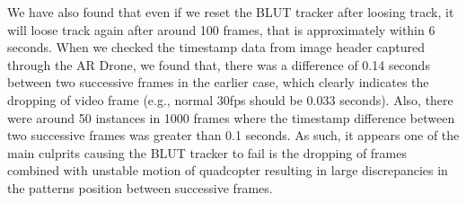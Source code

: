 \documentclass[10pt,twocolumn,letterpaper]{article}
\begin{document}
We have also found that even if we reset the BLUT tracker after loosing track,
it will loose track again after around 100 frames, that is approximately within
6 seconds. When we checked the timestamp data from image header captured through
the AR Drone, we found that, there was a difference of 0.14 seconds between two
successive frames in the earlier case, which clearly indicates the dropping of
video frame (e.g., normal 30fps should be 0.033 seconds). Also, there were around 50
instances in 1000 frames where the timestamp difference between two successive
frames was greater than 0.1 seconds. As such, it appears one of the main
culprits causing the BLUT tracker to fail is the dropping of frames combined
with unstable motion of quadcopter resulting in large discrepancies in the
patterns position between successive frames.
\end{document}
